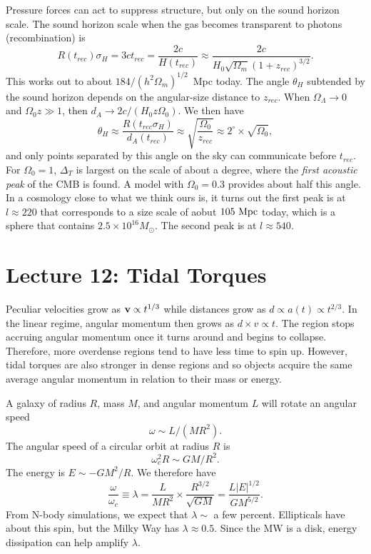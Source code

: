 \documentclass[]{article}
\begin{document}
Pressure forces can act to suppress structure, but only on the
sound horizon scale.  The sound horizon scale when the
gas becomes transparent to photons (recombination) is
\begin{equation}
R(t_{rec}) \sigma_H = 3 c t_{rec} = \frac{2c}{H(t_{rec})} \approx \frac{2c}{H_0\sqrt{\Omega_m}(1+z_{rec})^{3/2}}.
\end{equation}
\noindent
This works out to about $184/(h^2 \Omega_m)^{1/2}$~Mpc today.  The
angle $\theta_H$ subtended by the sound horizon depends on
the angular-size distance to $z_{rec}$.  When $\Omega_\Lambda\to0$
and $\Omega_0 z\gg1$, then $d_A\to 2c/(H_0 z \Omega_0)$. We then
have
\begin{equation}
\theta_H \approx \frac{R(t_{rec}\sigma_H)}{d_A(t_{rec})} \approx \sqrt{\frac{\Omega_0}{z_{rec}}} \approx 2^\circ \times \sqrt{\Omega_0},
\end{equation}
\noindent
and only points separated by this angle on the sky can communicate before $t_{rec}$.  For $\Omega_0=1$, $\Delta_T$ is largest on the scale of about a degree,
where the {\it first acoustic peak} of the CMB is found. A model
with $\Omega_0=0.3$ provides about half this angle. In a cosmology
close to what we think ours is, it turns out the 
first peak is at $l\approx 220$ that corresponds to a size scale of 
aobut $105~\mathrm{Mpc}$ today, which is a sphere that contains $2.5\times10^{16}M_{\odot}$.  The second peak is at $l\approx540$.


\section{Lecture 12: Tidal Torques}

Peculiar velocities grow as $\mathbf{v}\propto t^{1/3}$ while distances
grow as $d\propto a(t) \propto t^{2/3}$. In the linear regime,
angular momentum then grows as $d \times v\propto t$. The
region stops accruing angular momentum once it turns around
and begins to collapse. Therefore, more overdense regions 
tend to have less time to spin up.  However, tidal torques
are also stronger in dense regions and so objects
acquire the same average angular momentum in relation to their
mass or energy.

A galaxy of radius $R$, mass $M$, and angular momentum $L$
will rotate an angular speed
\begin{equation}
\omega \sim L / (MR^2).
\end{equation}
\noindent
The angular speed of a circular orbit at radius $R$ is
\begin{equation}
\omega_c^2 R \sim G M/R^2.
\end{equation}
The energy is $E\sim - GM^2/R$.  We therefore have 
\begin{equation}
\frac{\omega}{\omega_c}\equiv\lambda = \frac{L}{MR^2} \times \frac{R^{3/2}}{\sqrt{GM}} = \frac{L|E|^{1/2}}{GM^{5/2}}.
\end{equation}
\noindent
From N-body simulations, we expect that $\lambda\sim$ a  few percent.
Ellipticals have about this spin, but the Milky Way has $\lambda \approx 0.5$.
Since the MW is a disk, energy dissipation can help amplify $\lambda$.
\end{document}
